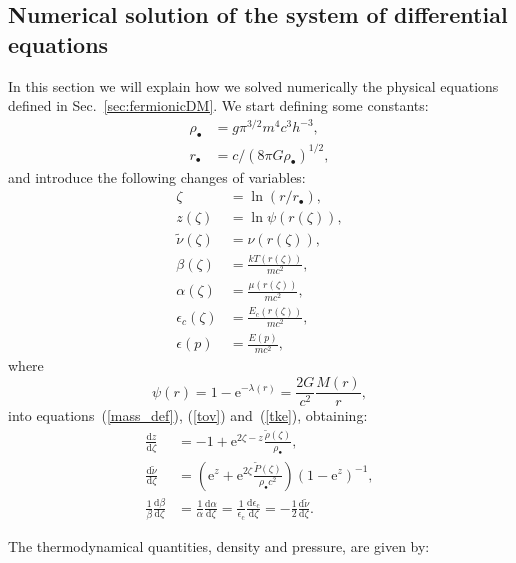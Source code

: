\documentclass[twocolumn]{aa}
\begin{document}
\begin{appendix}
\section{Numerical solution of the system of differential equations}
\label{app:numerical}
In this section we will explain how we solved numerically the physical equations defined in Sec.~\ref{sec:fermionicDM}.
We start defining some constants: 
\begin{align}
    \rho_{\bullet}&= g\pi^{3/2} m^4 c^3 h^{-3},\\
    r_\bullet &= c/(8\pi G \rho_\bullet)^{1/2},
\end{align}
and introduce the following changes of variables:
\begin{align}
   \zeta &= \ln(r/r_\bullet),\\
   z(\zeta) &=\ln\psi(r(\zeta)),\\
   \tilde{\nu}(\zeta) &=\nu(r(\zeta)),\\
   \beta(\zeta)&=\frac{kT(r(\zeta))}{mc^2},\\
   \alpha(\zeta)&=\frac{\mu(r(\zeta))}{mc^2},\\ 
   \epsilon_c(\zeta)&=\frac{E_c(r(\zeta))}{mc^2},\\
   \epsilon(p)&=\frac{E(p)}{mc^2},
\end{align}
where 
\begin{equation}
    \psi(r) = 1-\textrm{e}^{-\lambda(r)} = \frac{2G}{c^2}\frac{M(r)}{r},
    \label{mass_dm}
\end{equation}
into equations~(\ref{mass_def}), (\ref{tov}) and~(\ref{tke}), obtaining:
\begin{align}
   \label{sode}
   \frac{\mathrm{d}z}{\mathrm{d}\zeta} & = -1+\mathrm{e}^{2\zeta-z}\frac{\tilde{\rho}(\zeta)}{\rho_{\bullet}},\\
   \label{sode2}
   \frac{\mathrm{d}\tilde{\nu}}{\mathrm{d}\zeta} & = \left(\mathrm{e}^{z}+\mathrm{e}^{2\zeta}\frac{\tilde{P}(\zeta)}{\rho_{\bullet}c^2}\right)(1-\mathrm{e}^{z})^{-1},\\
   \frac{1}{\beta}\frac{\mathrm{d}\beta}{\mathrm{d}\zeta}&=\frac{1}{\alpha}\frac{\mathrm{d}\alpha}{\mathrm{d}\zeta}=
   \frac{1}{\epsilon_\mathrm{c}}\frac{\mathrm{d} \epsilon_\mathrm{c}}{\mathrm{d}\zeta}=-\frac{1}{2}\frac{\mathrm{d}\tilde{\nu}}{\mathrm{d}\zeta}.\label{tke2}
\end{align}


The thermodynamical quantities, density and pressure, are given by:


\end{appendix}
\end{document}
